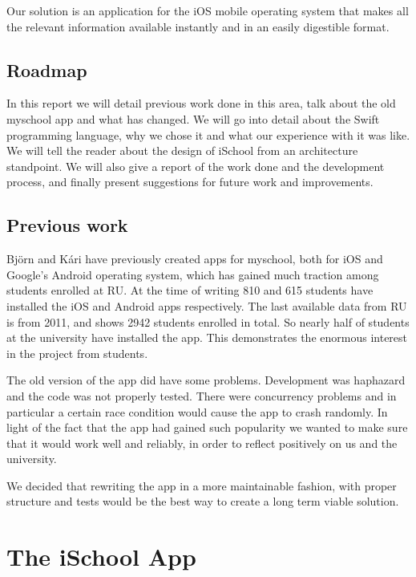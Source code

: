 \documentclass[pdftex, DIV=calc, paper=a4, fontsize=11pt, twocolumn]{scrartcl}	 %
\begin{document}
Our solution is an application for the iOS mobile operating system that makes all the relevant 
information available instantly and in an easily digestible format.



\subsection*{Roadmap}

In this report we will detail previous work done in this area, talk about the old myschool app
and what has changed. We will go into detail about the Swift programming language, why we chose it
and what our experience with it was like. We will tell the reader about the design of iSchool from
an architecture standpoint. We will also give a report of the work done and the development process,
and finally present suggestions for future work and improvements.


\subsection*{Previous work}

Björn and Kári have previously created apps for myschool, both for iOS and Google's Android operating
system, which has gained much traction among students enrolled at RU. At the time of writing 810 
and 615 students have installed the iOS and Android apps respectively. The last available data 
from RU is from 2011, and shows 2942 students enrolled in total. So nearly half of students at the 
university have installed the app. This demonstrates the enormous interest in the project from
students.

The old version of the app did have some problems. Development was haphazard and the code was not
properly tested. There were concurrency problems and in particular a certain race condition would
cause the app to crash randomly. In light of the fact that the app had gained such popularity we 
wanted to make sure that it would work well and reliably, in order to reflect positively on us and
the university.

We decided that rewriting the app in a more maintainable fashion, with proper structure and tests
would be the best way to create a long term viable solution.


\section*{The iSchool App}
\end{document}
